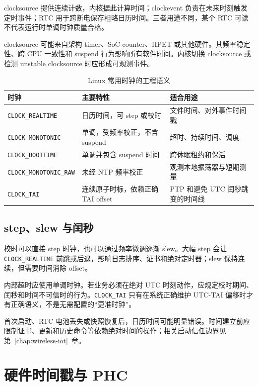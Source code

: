 clocksource 提供连续计数，内核据此计算时间；clockevent 负责在未来时刻触发定时事件；RTC 用于跨断电保存粗略日历时间。三者用途不同，某个 RTC 可读不代表运行时单调时钟质量合格\cite{linux-timekeeping}。

clocksource 可能来自架构 timer、SoC counter、HPET 或其他硬件。其频率稳定性、跨 CPU 一致性和 suspend 行为影响所有软件时间。内核切换 clocksource 或检测 unstable clocksource 时应形成可观测事件。

\begin{table}[htbp]
  \centering
  \caption{Linux 常用时钟的工程语义}
  \small
  \begin{tabular}{p{32mm}p{38mm}p{58mm}}
    \hline
    时钟 & 主要特性 & 适合用途 \\
    \hline
    \texttt{CLOCK\_REALTIME} & 日历时间，可 step 或校时 & 文件时间、对外事件时间戳 \\
    \texttt{CLOCK\_MONOTONIC} & 单调，受频率校正，不含 suspend & 超时、持续时间、调度 \\
    \texttt{CLOCK\_BOOTTIME} & 单调并包含 suspend 时间 & 跨休眠租约和保活 \\
    \texttt{CLOCK\_MONOTONIC\_RAW} & 未经 NTP 频率校正 & 观测本地振荡器与短期测量 \\
    \texttt{CLOCK\_TAI} & 连续原子时标，依赖正确 TAI offset & PTP 和避免 UTC 闰秒跳变的时间线 \\
    \hline
  \end{tabular}
\end{table}

\subsection{step、slew 与闰秒}

校时可以直接 step 时钟，也可以通过频率微调逐渐 slew。大幅 step 会让 \texttt{CLOCK\_REALTIME} 前跳或后退，影响日志排序、证书和绝对定时器；slew 保持连续，但需要时间消除 offset。

内部超时应使用单调时钟。若业务必须在绝对 UTC 时刻动作，应规定校时期间、闰秒和时间不可信时的行为。\texttt{CLOCK\_TAI} 只有在系统正确维护 UTC-TAI 偏移时才有正确语义，不是无需配置的“更准时钟”。

首次启动、RTC 电池丢失或快照恢复后，日历时间可能明显错误。时间建立前应限制证书、更新和历史命令等依赖绝对时间的操作；相关启动信任边界见\mbox{第~\ref{chap:wireless-iot}~章}。

\section{硬件时间戳与 PHC}

